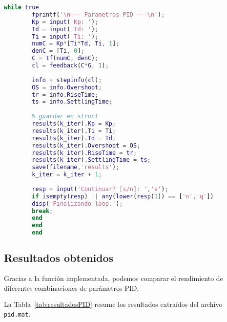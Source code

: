 \begin{strip}
\vspace{-\baselineskip} %
\noindent
\begin{minipage}{0.98\textwidth}


	\begin{lstlisting}[language=Matlab, style=matlabstyle, caption={Función para diseño PID por prueba y error.}, label={lst:disenoPID}]
		while true
		fprintf('\n--- Parametros PID ---\n');
		Kp = input('Kp: ');
		Td = input('Td: ');
		Ti = input('Ti: ');
		numC = Kp*[Ti*Td, Ti, 1];
		denC = [Ti, 0];
		C = tf(numC, denC);
		cl = feedback(C*G, 1);
		
		info = stepinfo(cl);
		OS = info.Overshoot;
		tr = info.RiseTime;
		ts = info.SettlingTime;
		
		% guardar en struct
		results(k_iter).Kp = Kp;
		results(k_iter).Ti = Ti;
		results(k_iter).Td = Td;
		results(k_iter).Overshoot = OS;
		results(k_iter).RiseTime = tr;
		results(k_iter).SettlingTime = ts;
		save(filename,'results');
		k_iter = k_iter + 1;
		
		resp = input('Continuar? [s/n]: ','s');
		if isempty(resp) || any(lower(resp(1)) == ['n','q'])
		disp('Finalizando loop.');
		break;
		end
		end
		end
	\end{lstlisting}
\end{minipage}
\vspace{-\baselineskip} %

\end{strip}



\subsection{Resultados obtenidos}


Gracias a la función implementada, podemos comparar el rendimiento de diferentes combinaciones de parámetros PID. 

La Tabla~\ref{tab:resultadosPID} resume los resultados extraídos del archivo \texttt{pid.mat}.



